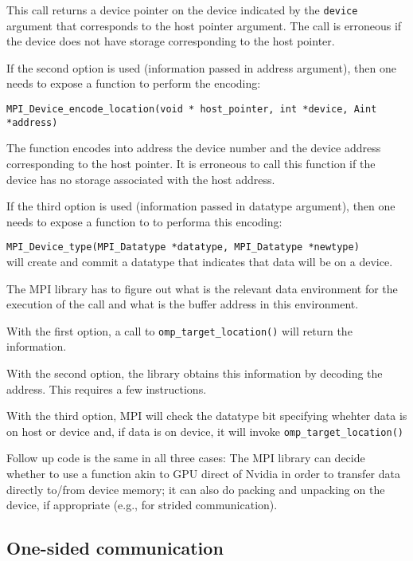 \documentclass[twoside,11pt]{article}
\begin{document}
This call returns a device pointer on the device indicated by the 
\texttt{device} argument that corresponds to the host pointer argument. The 
call is erroneous if the device does not have storage corresponding to 
the host pointer.

If the second option is used (information passed in address argument), then one 
needs to expose a function to perform the encoding:

\texttt{MPI\_Device\_encode\_location(void * host\_pointer, int *device, Aint
	*address)} 

The function encodes into address  the device number and the device address 
corresponding to the host pointer. It is erroneous to call this function if the 
device has no storage associated with the host address.

If the third option is used (information passed in datatype argument), then one 
needs to expose a function to to performa this encoding:

\texttt{MPI\_Device\_type(MPI\_Datatype *datatype, MPI\_Datatype *newtype)}	
 \\
will create and commit a datatype that indicates that data will be on a device.


The MPI library has to figure out what is the relevant data environment for the 
execution of the call and what is the buffer address in this environment.

With the first option, a call to \texttt{omp\_target\_location()} will return 
the information.

With the second option, the library obtains this information by decoding the 
address. This requires a few instructions.

With the third option, MPI will check the datatype bit specifying whehter data 
is on host or device and, if data is on device, it will invoke 
\texttt{omp\_target\_location()}

Follow up code is the same in all three cases: The MPI library can decide 
whether to use a function akin to GPU direct of Nvidia in order to transfer 
data directly to/from device memory; it can also do packing and unpacking on 
the device, if appropriate (e.g., for strided communication).

\subsection{One-sided communication}
\end{document}
